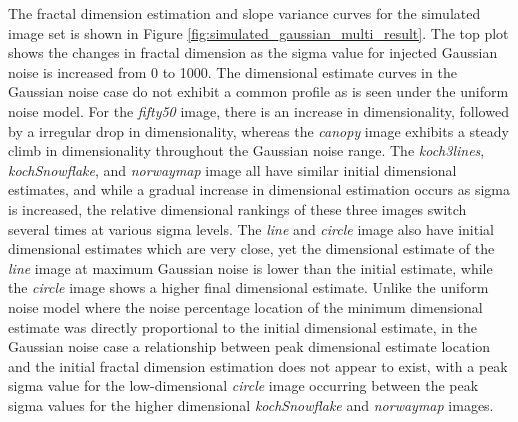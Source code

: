 \documentclass[12pt, oneside]{book}
\begin{document}
The fractal dimension estimation and slope variance curves for the simulated image set is shown in Figure \ref{fig:simulated_gaussian_multi_result}.  The top plot shows the changes in fractal dimension as the sigma value for injected Gaussian noise is increased from 0 to 1000.  The dimensional estimate curves in the Gaussian noise case do not exhibit a common profile as is seen under the uniform noise model.  For the \textit{fifty50} image, there is an increase in dimensionality, followed by a irregular drop in dimensionality, whereas the \textit{canopy} image exhibits a steady climb in dimensionality throughout the Gaussian noise range.  The \textit{koch3lines}, \textit{kochSnowflake}, and \textit{norwaymap} image all have similar initial dimensional estimates, and while a gradual increase in dimensional estimation occurs as sigma is increased, the relative dimensional rankings of these three images switch several times at various sigma levels.  The \textit{line} and \textit{circle} image also have initial dimensional estimates which are very close, yet the dimensional estimate of the  \textit{line} image at maximum Gaussian noise is lower than the initial estimate, while the \textit{circle} image shows a higher final dimensional estimate.  Unlike the uniform noise model where the noise percentage location of the minimum dimensional estimate was directly proportional to the initial dimensional estimate, in the Gaussian noise case a relationship between peak dimensional estimate location and the initial fractal dimension estimation does not appear to exist, with a peak sigma value for the low-dimensional \textit{circle} image occurring between the peak sigma values for the higher dimensional \textit{kochSnowflake} and \textit{norwaymap} images.
\end{document}
